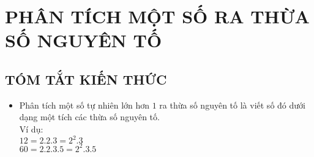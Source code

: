\section{PHÂN TÍCH MỘT SỐ RA THỪA SỐ NGUYÊN TỐ}
\subsection{TÓM TẮT KIẾN THỨC}
\begin{tomtat}

\begin{itemize}
\item Phân tích một số tự nhiên lớn hơn $1$ ra thừa số nguyên tố là viết số đó dưới dạng một tích các thừa số nguyên tố.\\
Ví dụ: \\
$12 = 2.2.3 = {2^2}.3$\\
$60 = 2.2.3.5 = {2^2}.3.5$
\end{itemize}
\end{tomtat}
